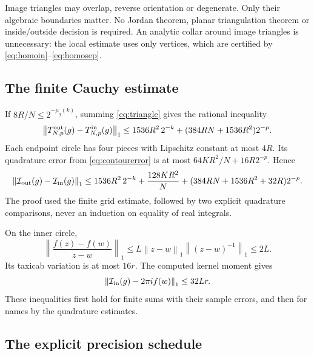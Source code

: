 \documentclass[11pt]{article}
\theoremstyle{definition}
\newcommand{\norm}[1]{\left\lVert#1\right\rVert_1}
\newcommand{\Int}{\mathcal I}
\begin{document}
Image triangles may overlap, reverse orientation or degenerate. Only
their algebraic boundaries matter. No Jordan theorem, planar triangulation
theorem or inside/outside decision is required. An analytic collar
around image triangles is unnecessary: the local estimate uses only
vertices, which are certified by \eqref{eq:homoin}--\eqref{eq:homosep}.

\subsection{The finite Cauchy estimate}\label{sec:cfinite}

If \(8R/N\le2^{-\mu_g(k)}\), summing \eqref{eq:triangle} gives the rational
inequality
\begin{equation}\label{eq:gridestimate}
 \norm{T_{N,p}^{\rm out}(g)-T_{N,p}^{\rm in}(g)}
 \le1536R^2\,2^{-k}+(384RN+1536R^2)2^{-p}.
\end{equation}
Each endpoint circle has four pieces with Lipschitz constant at most
\(4R\). Its quadrature error from \eqref{eq:contourerror} is at most
\(64KR^2/N+16R2^{-p}\). Hence
\begin{align}
 \norm{\Int_{\rm out}(g)-\Int_{\rm in}(g)}
 \le1536R^2\,2^{-k}
      +\frac{128KR^2}{N}
      +(384RN+1536R^2+32R)2^{-p}.\label{eq:homofinite}
\end{align}
The proof used the finite grid estimate, followed by two explicit
quadrature comparisons, never an induction on equality of real integrals.

On the inner circle,
\[
 \norm{\frac{f(z)-f(w)}{z-w}}
 \le L\norm{z-w}\norm{(z-w)^{-1}}\le2L.
\]
Its taxicab variation is at most \(16r\). The computed kernel moment gives
\begin{equation}\label{eq:smallcircle}
 \norm{\Int_{\rm in}(g)-2\pi i f(w)}\le32Lr.
\end{equation}
These inequalities first hold for finite sums with their sample errors,
and then for names by the quadrature estimates.

\subsection{The explicit precision schedule}\label{sec:cschedule}
\end{document}
